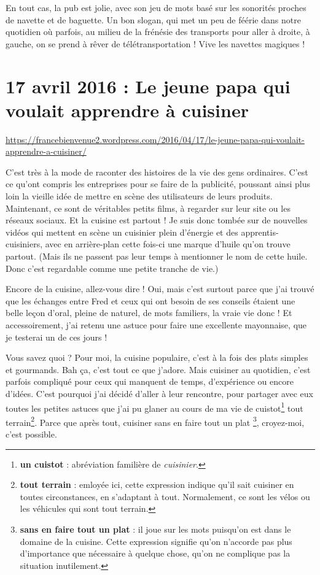 \documentclass[11pt, french]{report}
\begin{document}
En tout cas, la pub est jolie, avec son jeu de mots basé sur les sonorités
proches de navette et de baguette. Un bon slogan, qui met un peu de féérie dans
notre quotidien où parfois, au milieu de la frénésie des transports pour aller
à droite, à gauche, on se prend à rêver de télétransportation ! Vive les
navettes magiques ! 

\vfill

\chapter{17 avril 2016 : Le jeune papa qui voulait apprendre à cuisiner}

\url{https://francebienvenue2.wordpress.com/2016/04/17/le-jeune-papa-qui-voulait-apprendre-a-cuisiner/}

\vfill

C’est très à la mode de raconter des histoires de la vie des gens ordinaires.
C’est ce qu’ont compris les entreprises pour se faire de la publicité, poussant
ainsi plus loin la vieille idée de mettre en scène des utilisateurs de leurs
produits. Maintenant, ce sont de véritables petits films, à regarder sur leur
site ou les réseaux sociaux. Et la cuisine est partout ! Je suis donc tombée sur
de nouvelles vidéos qui mettent en scène un cuisinier plein d’énergie et des
apprentis-cuisiniers, avec en arrière-plan cette fois-ci une marque d’huile
qu’on trouve partout. (Mais ils ne passent pas leur temps à mentionner le nom
de cette huile. Donc c’est regardable comme une petite tranche de vie.)

Encore de la cuisine, allez-vous dire ! Oui, mais c’est surtout parce que j’ai
trouvé que les échanges entre Fred et ceux qui ont besoin de ses conseils étaient
une belle leçon d’oral, pleine de naturel, de mots familiers, la vraie vie donc !
Et accessoirement, j’ai retenu une astuce pour faire une excellente mayonnaise,
que je testerai un de ces jours !

\vfill

Vous savez quoi ? Pour moi, la cuisine populaire, c’est à la fois des plats
simples et gourmands. Bah ça, c’est tout ce que j’adore. Mais cuisiner au
quotidien, c’est parfois compliqué pour ceux qui manquent de temps, d’expérience
ou encore d’idées. C’est pourquoi j’ai décidé d’aller à leur rencontre, pour
partager avec eux toutes les petites astuces que j’ai pu glaner au cours de ma
vie de cuistot\footnote{\textbf{un cuistot} : abréviation familière de
  \textit{cuisinier}.} tout terrain\footnote{\textbf{tout terrain} : emloyée ici,
  cette expression indique qu’il sait cuisiner en toutes circonstances, en
  s’adaptant à tout. Normalement, ce sont les vélos ou les véhicules qui sont
  tout terrain.}. Parce que après tout, cuisiner sans en faire tout un plat
\footnote{\textbf{sans en faire tout un plat} : il joue sur les mots puisqu’on
  est dans le domaine de la cuisine. Cette expression signifie qu’on n’accorde
  pas plus d’importance que nécessaire à quelque chose, qu’on ne complique pas
  la situation inutilement.}, croyez-moi, c’est possible.
\end{document}
